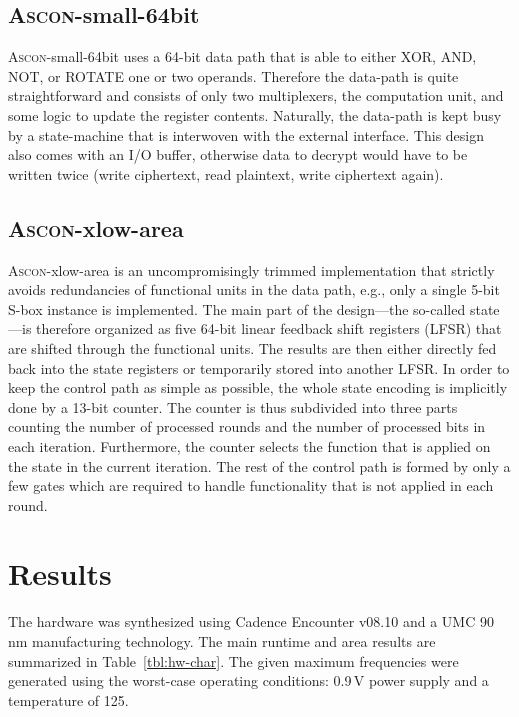 \documentclass[runningheads]{llncs}
\begin{document}
\subsection{\textsc{Ascon}-small-64bit}

\textsc{Ascon}-small-64bit uses a 64-bit data path that is able to either XOR, AND, NOT, or ROTATE one or two operands. Therefore the data-path is quite straightforward and consists of only two multiplexers, the computation unit, and some logic to update the register contents. Naturally, the data-path is kept busy by a state-machine that is interwoven with the external interface. This design also comes with an I/O buffer, otherwise data to decrypt would have to be written twice (write ciphertext, read plaintext, write ciphertext again). 

\subsection{\textsc{Ascon}-xlow-area}

\textsc{Ascon}-xlow-area is an uncompromisingly trimmed implementation that strictly avoids redundancies of functional units in the data path, e.g., only a single 5-bit S-box instance is implemented. The main part of the design---the so-called state---is therefore organized as five 64-bit linear feedback shift registers (LFSR) that are shifted through the functional units. The results are then either directly fed back into the state registers or temporarily stored into another LFSR. In order to keep the control path as simple as possible, the whole state encoding is implicitly done by a 13-bit counter. The counter is thus subdivided into three parts counting the number of processed rounds and the number of processed bits in each iteration. Furthermore, the counter selects the function that is applied on the state in the current iteration. The rest of the control path is formed by only a few gates which are required to handle functionality that is not applied in each round.


\section{Results} \label{sec:results}

The hardware was synthesized using Cadence Encounter v08.10 and a UMC 90\,nm manufacturing technology. The main runtime and area results are summarized in Table~\ref{tbl:hw-char}.
The given maximum frequencies were generated using  the worst-case operating
conditions: 0.9\,V power supply and a temperature of 125\celsius.
\end{document}
